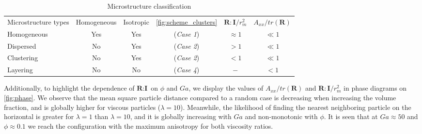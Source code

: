 \begin{table}[h!]
    \caption{Microstructure classification}
    \label{tab:microstructure}
    \centering
    \begin{tabular}{|lccccc|} \hline
        Microstructure types & Homogeneous & Isotropic & \ref{fig:scheme_clusters} & $\textbf{R}:\textbf{I}/r_m^2$ & $A_{xx}/tr(\textbf{R})$ \\
        Homogeneous & Yes & Yes &(\textit{Case 1}) & $ \approx 1$ & $\ll 1$ \\
        Dispersed &  No & Yes  &(\textit{Case 2}) & $ > 1$ & $\ll 1$ \\
        Clustering &  No & Yes  &(\textit{Case 2}) & $ < 1$ & $\ll 1$ \\
        Layering &    No & No  &(\textit{Case 4}) & $ - $ & $< 1$\\ \hline
    \end{tabular}
\end{table}
Additionally, to highlight the dependence of $\textbf{R}:\textbf{I}$ on $\phi$ and $Ga$, we display the values of $A_{xx}/tr(\textbf{R})$ and $\textbf{R}:\textbf{I}/r_m^2$ in phase diagrams on \ref{fig:phase}.
We observe that the mean square particle distance compared to a random case is decreasing when increasing the volume fraction, and is globally higher for viscous particles ($\lambda = 10$).
Meanwhile, the likelihood of finding the nearest neighboring particle on the horizontal is greater for $\lambda=1$ than $\lambda = 10$, and it is globally increasing with  $Ga$ and non-monotonic with $\phi$. 
It is seen that at $Ga \approx 50$ and $\phi \approx 0.1$ we reach the configuration with the maximum anisotropy for both viscosity ratios. 

